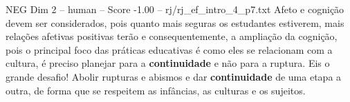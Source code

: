 \begin{textsample}{NEG Dim 2 – human – Score -1.00 – rj/rj\_ef\_intro\_4\_p7.txt}  \label{ex:f2_neg_001}
Afeto e cognição devem ser considerados, pois quanto mais seguras os estudantes estiverem, mais relações afetivas positivas terão e consequentemente, a ampliação da cognição, pois o principal foco das práticas educativas é como eles se relacionam com a cultura, é preciso planejar para a \textbf{continuidade} e não para a ruptura.
Eis o grande desafio!
Abolir rupturas e abismos e dar \textbf{continuidade} de uma etapa a outra, de forma que se respeitem as infâncias, as culturas e os sujeitos.

\end{textsample}
